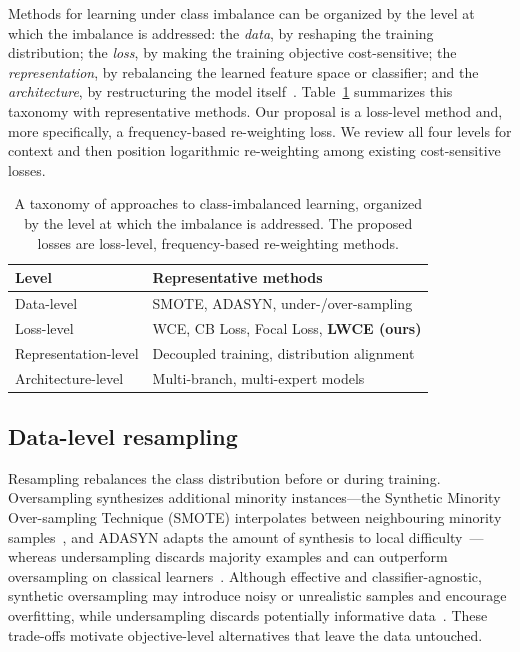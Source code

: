 \documentclass[a4paper,fleqn]{cas-sc}
\begin{document}
Methods for learning under class imbalance can be organized by the level at which
the imbalance is addressed: the \emph{data}, by reshaping the training
distribution; the \emph{loss}, by making the training objective cost-sensitive;
the \emph{representation}, by rebalancing the learned feature space or classifier;
and the \emph{architecture}, by restructuring the model
itself~\citep{he2009,johnson2019,krawczyk2016,branco2016,zhang2023,chen2024}.
Table~\ref{tab:taxonomy} summarizes this taxonomy with representative methods. Our
proposal is a loss-level method and, more specifically, a frequency-based
re-weighting loss. We review all four levels for context and then position
logarithmic re-weighting among existing cost-sensitive losses.

\begin{table}[pos=h]
\centering
\caption{A taxonomy of approaches to class-imbalanced learning, organized by the
level at which the imbalance is addressed. The proposed losses are loss-level,
frequency-based re-weighting methods.}
\label{tab:taxonomy}
\begin{tabular}{ll}
\toprule
Level & Representative methods \\
\midrule
Data-level          & SMOTE, ADASYN, under-/over-sampling \\
Loss-level          & WCE, CB Loss, Focal Loss, \textbf{LWCE (ours)} \\
Representation-level & Decoupled training, distribution alignment \\
Architecture-level  & Multi-branch, multi-expert models \\
\bottomrule
\end{tabular}
\end{table}

\subsection{Data-level resampling}
Resampling rebalances the class distribution before or during training.
Oversampling synthesizes additional minority instances---the Synthetic Minority
Over-sampling Technique (SMOTE) interpolates between neighbouring minority
samples~\citep{chawla2002}, and ADASYN adapts the amount of synthesis to local
difficulty~\citep{he2008}---whereas undersampling discards majority examples and
can outperform oversampling on classical learners~\citep{drummond2003}. Although
effective and classifier-agnostic, synthetic oversampling may introduce noisy or
unrealistic samples and encourage overfitting, while undersampling discards
potentially informative data~\citep{buda2018,branco2016}. These trade-offs
motivate objective-level alternatives that leave the data untouched.
\end{document}
